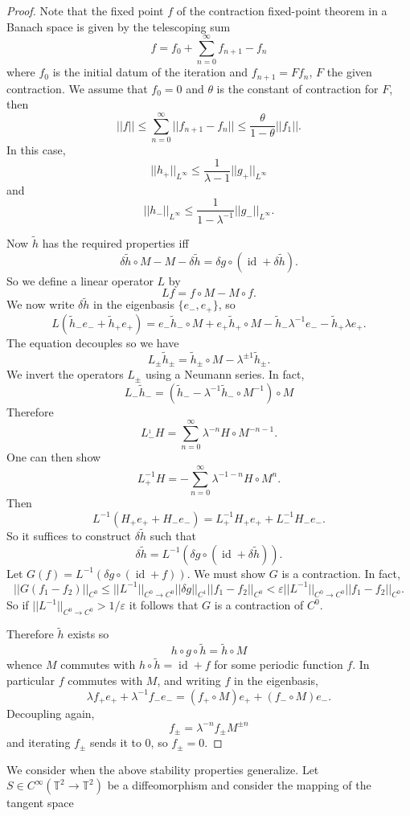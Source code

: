 \documentclass[12pt]{report}
\newcommand{\TT}{\mathbb{T}}
\newcommand{\id}{\operatorname{id}}
\theoremstyle{definition}
\begin{document}
\begin{proof}
Note that the fixed point $f$ of the contraction fixed-point theorem in a Banach space is given by the telescoping sum
$$f = f_0 + \sum_{n=0}^\infty f_{n+1} - f_n$$
where $f_0$ is the initial datum of the iteration and $f_{n+1} = Ff_n$, $F$ the given contraction. We assume that $f_0 = 0$ and $\theta$ is the constant of contraction for $F$, then
$$||f|| \leq \sum_{n=0}^\infty ||f_{n+1} - f_n|| \leq \frac{\theta}{1 - \theta} ||f_1||.$$
In this case,
$$||h_+||_{L^\infty} \leq \frac{1}{\lambda - 1} ||g_+||_{L^\infty}$$
and
$$||h_-||_{L^\infty} \leq \frac{1}{1 - \lambda^{-1}} ||g_-||_{L^\infty}.$$

Now $\tilde h$ has the required properties iff
$$\delta \tilde h \circ M - M - \delta \tilde h = \delta g \circ (\id + \delta \tilde h).$$
So we define a linear operator $L$ by
$$Lf = f \circ M - M \circ f.$$
We now write $\delta \tilde h$ in the eigenbasis $\{e_-, e_+\}$, so
$$L(\tilde h_- e_- + \tilde h_+e_+) = e_- \tilde h_- \circ M + e_+ \tilde h_+ \circ M - \tilde h_- \lambda^{-1} e_- - \tilde h_+ \lambda e_+.$$
The equation decouples so we have
$$L_\pm \tilde h_\pm = \tilde h_\pm \circ M - \lambda^{\pm 1} \tilde h_\pm.$$
We invert the operators $L_\pm$ using a Neumann series. In fact,
$$L_- \tilde h_- = (\tilde h_- - \lambda^{-1} \tilde h_- \circ M^{-1}) \circ M$$
Therefore
$$L_-^{_1}H = \sum_{n=0}^\infty \lambda^{-n} H \circ M^{-n-1}.$$
One can then show
$$L_+^{-1}H = -\sum_{n=0}^\infty \lambda^{-1-n}H \circ M^n.$$
Then
$$L^{-1}(H_+ e_+ + H_- e_-) = L_+^{-1}H_+e_+ + L_-^{-1}H_-e_-.$$
So it suffices to construct $\delta \tilde h$ such that
$$\delta \tilde h = L^{-1}(\delta g \circ (\id + \delta \tilde h)).$$
Let $G(f) = L^{-1}(\delta g \circ (\id + f))$.
We must show $G$ is a contraction. In fact,
$$||G(f_1 - f_2)||_{C^0} \leq ||L^{-1}||_{C^0 \to C^0} ||\delta g||_{C^1} ||f_1 - f_2||_{C^0} < \varepsilon ||L^{-1}||_{C^0 \to C^0} ||f_1 - f_2||_{C^0}.$$
So if $||L^{-1}||_{C^0 \to C^0} > 1/\varepsilon$ it follows that $G$ is a contraction of $C^0$.

Therefore $\tilde h$ exists so
$$h \circ g \circ \tilde h = \tilde h \circ M$$
whence $M$ commutes with $h \circ \tilde h = \id + f$ for some periodic function $f$. In particular $f$ commutes with $M$, and writing $f$ in the eigenbasis,
$$\lambda f_+ e_+ + \lambda^{-1} f_- e_- = (f_+ \circ M)e_+ + (f_- \circ M) e_-.$$
Decoupling again,
$$f_\pm = \lambda^{-n} f_\pm M^{\pm n}$$
and iterating $f_\pm$ sends it to $0$, so $f_\pm = 0$.
\end{proof}
We consider when the above stability properties generalize. Let $S \in C^\infty(\TT^2 \to \TT^2)$ be a diffeomorphism and consider the mapping of the tangent space
\end{document}
